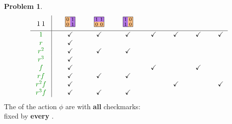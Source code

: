 \documentclass[12pt]{article}
\theoremstyle{definition} %
\newtheorem{problem}{Problem}
\begin{document}
\begin{problem}
\[\begin{tabular}{c|cccccccccccccc}
\begin{tikzpicture}[scale=.5]
      \draw (.25,.25) node{$1$}; \draw (.75,.25) node{$1$};
    \end{tikzpicture}
    &&
    \begin{tikzpicture}[scale=.5]
      \tikzstyle{every node}=[font=\scriptsize]
      \path[fill=actOrange] (0,.5) rectangle ++(.5,.5); 
      \path[fill=actPurple] (.5,.5) rectangle ++(.5,.5);
      \path[fill=actOrange] (0,0) rectangle ++(.5,.5);
      \path[fill=actPurple] (.5,0) rectangle ++(.5,.5);
      \draw (0,0) rectangle (1,1);
      \draw (.25,.75) node{$0$}; \draw (.75,.75) node{$1$};
      \draw (.25,.25) node{$0$}; \draw (.75,.25) node{$1$};
    \end{tikzpicture}
    &&
    \begin{tikzpicture}[scale=.5]
      \tikzstyle{every node}=[font=\scriptsize]
      \path[fill=actPurple] (0,.5) rectangle ++(.5,.5); 
      \path[fill=actPurple] (.5,.5) rectangle ++(.5,.5);
      \path[fill=actOrange] (0,0) rectangle ++(.5,.5);
      \path[fill=actOrange] (.5,0) rectangle ++(.5,.5);
      \draw (0,0) rectangle (1,1);
      \draw (.25,.75) node{$1$}; \draw (.75,.75) node{$1$};
      \draw (.25,.25) node{$0$}; \draw (.75,.25) node{$0$};
    \end{tikzpicture}
    &&
    \begin{tikzpicture}[scale=.5]
      \tikzstyle{every node}=[font=\scriptsize]
      \path[fill=actPurple] (0,.5) rectangle ++(.5,.5); 
      \path[fill=actOrange] (.5,.5) rectangle ++(.5,.5);
      \path[fill=actPurple] (0,0) rectangle ++(.5,.5);
      \path[fill=actOrange] (.5,0) rectangle ++(.5,.5);
      \draw (0,0) rectangle (1,1);
      \draw (.25,.75) node{$1$}; \draw (.75,.75) node{$0$};
      \draw (.25,.25) node{$1$}; \draw (.75,.25) node{$0$};
    \end{tikzpicture}
    \\ 
    \hline $\Galert{1}$ && \checkmark && \checkmark && \checkmark && \checkmark && \checkmark && \checkmark && \checkmark  \\
    $\Galert{r}$ && \checkmark && && && && && && \\
    $\Galert{r^2}$ && \checkmark && \checkmark && \checkmark && && && && \\
    $\Galert{r^3}$ && \checkmark && && && && && && \\
    $\Galert{f}$ && \checkmark && && && \checkmark && && \checkmark && \\
    $\Galert{rf}$ && \checkmark && \checkmark && \checkmark && && && && \\
    $\Galert{r^2f}$ && \checkmark && && && && \checkmark && && \checkmark \\
    $\Galert{r^3f}$ && \checkmark && \checkmark && \checkmark && && && && 
  \end{tabular}
  \]
  The  of the action $\phi$ are  with \textbf{all} checkmarks: 
  \\ fixed by \textbf{every} . 
  

\end{problem}
\end{document}

